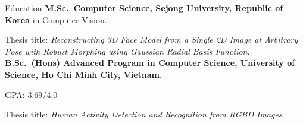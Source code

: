 \begin{rubric}{Education}
\entry*[03/2017 -- Present]%
	\textbf{M.Sc.~Computer Science, Sejong University, Republic of Korea} in Computer Vision.\par
 	Thesis title: \emph{Reconstructing 3D Face Model from a Single 2D Image at Arbitrary Pose with Robust Morphing using Gaussian Radial Basis Function}.
%
\entry*[10/2012 -- 11/2016]%
	\textbf{B.Sc.~(Hons) Advanced Program in Computer Science, University of Science, Ho Chi Minh City, Vietnam.}\par
    GPA: 3.69/4.0 \par 
    Thesis title: \emph{Human Activity Detection and Recognition from RGBD Images}
	
%
\end{rubric}
